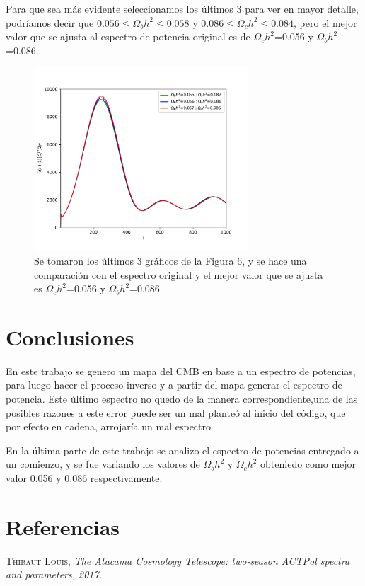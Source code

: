 \documentclass[a4paper]{article}
\begin{document}
Para que sea más evidente seleccionamos los últimos 3 para ver en mayor detalle, podríamos decir que $0.056\leq \Omega_bh^2\leq 0.058$ y $0.086\leq \Omega_ch^2\leq 0.084$, pero  el mejor valor que se ajusta al espectro de potencia original es de $\Omega_c h^2$=0.056 y $\Omega_b h^2$=0.086.

\begin{figure}
    \centering
    \includegraphics[width=8cm]{mejores_parametros.pdf}
    \caption{Se tomaron los últimos 3 gráficos de la Figura 6, y se hace una comparación con el espectro original y el mejor valor que se ajusta es $\Omega_c h^2$=0.056 y $\Omega_b h^2$=0.086}
    \label{fig:my_label}
\end{figure}

\section{Conclusiones}

En este trabajo se genero un mapa del CMB en base a un espectro de potencias, para luego hacer el proceso inverso y a partir del mapa generar el espectro de potencia. Este último espectro no quedo de la manera correspondiente,una de las posibles razones a este error puede ser un mal planteó al inicio  del código, que por efecto en cadena, arrojaría un mal espectro

En la última parte de este trabajo se analizo el espectro de potencias entregado a un comienzo, y se fue variando los valores de $\Omega_bh^2$ y $\Omega_ch^2$ obteniedo como mejor valor 0.056 y 0.086 respectivamente. 

\section{Referencias}

 \textsc{Thibaut Louis},
\textit{The Atacama Cosmology Telescope: two-season ACTPol spectra and parameters, 2017.}
\end{document}

